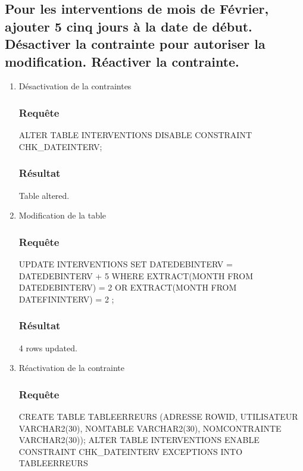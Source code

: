 \documentclass[•]{article}
\begin{document}
\subsection{Pour les interventions de mois de Février, ajouter 5 cinq jours à la date de début. Désactiver la contrainte pour autoriser la modification. Réactiver la contrainte.}
\begin{enumerate}
    \item Désactivation de la contraintes
    \subsubsection{Requête}
    \begin{sql}
    ALTER TABLE INTERVENTIONS DISABLE CONSTRAINT CHK_DATEINTERV;
    \end{sql}
    \subsubsection{Résultat}
    \begin{sql}
    Table altered.
    \end{sql}
    \item Modification de la table
    \subsubsection{Requête}
    \begin{sql}
    UPDATE INTERVENTIONS SET DATEDEBINTERV =  DATEDEBINTERV + 5 WHERE EXTRACT(MONTH FROM DATEDEBINTERV) = 2 OR EXTRACT(MONTH FROM DATEFININTERV) = 2 ;
    \end{sql}
    \subsubsection{Résultat}
    \begin{sql}
    4 rows updated.
    \end{sql}
    \item Réactivation de la contrainte
    \subsubsection{Requête}
    \begin{sql}
    CREATE TABLE TABLEERREURS (ADRESSE ROWID, UTILISATEUR VARCHAR2(30), NOMTABLE VARCHAR2(30), NOMCONTRAINTE VARCHAR2(30));
    ALTER TABLE INTERVENTIONS ENABLE CONSTRAINT CHK_DATEINTERV EXCEPTIONS INTO TABLEERREURS
    \end{sql}

\end{enumerate}
\end{document}
